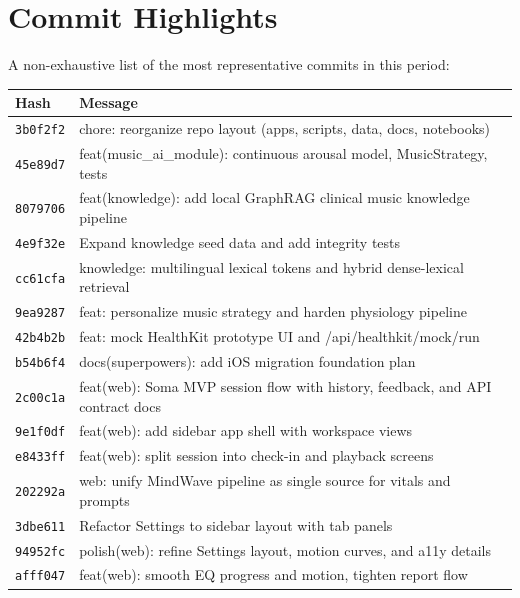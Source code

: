\documentclass[11pt,a4paper]{article}
\begin{document}
\appendix
\section{Commit Highlights}

A non-exhaustive list of the most representative commits in this period:

\begin{longtable}{lp{10cm}}
\toprule
\textbf{Hash} & \textbf{Message}\\
\midrule
\endhead
\texttt{3b0f2f2} & chore: reorganize repo layout (apps, scripts, data, docs, notebooks)\\
\texttt{45e89d7} & feat(music\_ai\_module): continuous arousal model, MusicStrategy, tests\\
\texttt{8079706} & feat(knowledge): add local GraphRAG clinical music knowledge pipeline\\
\texttt{4e9f32e} & Expand knowledge seed data and add integrity tests\\
\texttt{cc61cfa} & knowledge: multilingual lexical tokens and hybrid dense-lexical retrieval\\
\texttt{9ea9287} & feat: personalize music strategy and harden physiology pipeline\\
\texttt{42b4b2b} & feat: mock HealthKit prototype UI and /api/healthkit/mock/run\\
\texttt{b54b6f4} & docs(superpowers): add iOS migration foundation plan\\
\texttt{2c00c1a} & feat(web): Soma MVP session flow with history, feedback, and API contract docs\\
\texttt{9e1f0df} & feat(web): add sidebar app shell with workspace views\\
\texttt{e8433ff} & feat(web): split session into check-in and playback screens\\
\texttt{202292a} & web: unify MindWave pipeline as single source for vitals and prompts\\
\texttt{3dbe611} & Refactor Settings to sidebar layout with tab panels\\
\texttt{94952fc} & polish(web): refine Settings layout, motion curves, and a11y details\\
\texttt{afff047} & feat(web): smooth EQ progress and motion, tighten report flow\\
\bottomrule
\end{longtable}
\end{document}
